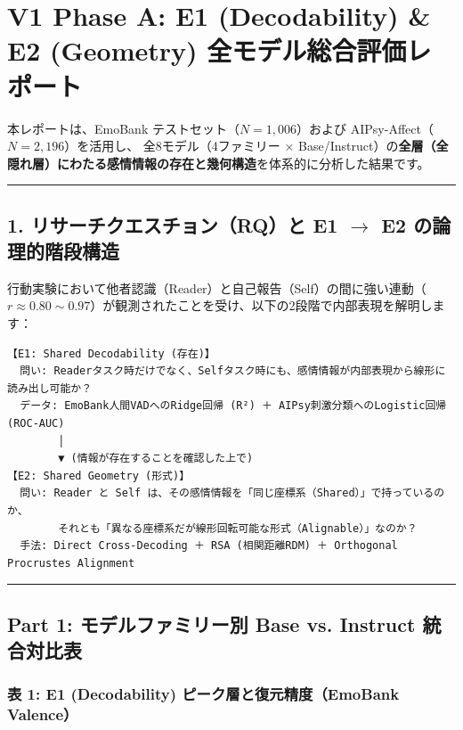 \section{V1 Phase A: E1 (Decodability) \& E2 (Geometry) 全モデル総合評価レポート}

本レポートは、EmoBank テストセット（$N=1,006$）および AIPsy-Affect（$N=2,196$）を活用し、
全8モデル（4ファミリー × Base/Instruct）の\textbf{全層（全隠れ層）にわたる感情情報の存在と幾何構造}を体系的に分析した結果です。

\vspace{0.5em}\hrule\vspace{0.5em}

\subsection{1. リサーチクエスチョン（RQ）と E1 $\rightarrow$ E2 の論理的階段構造}

行動実験において他者認識（Reader）と自己報告（Self）の間に強い連動（$r \approx 0.80 \sim 0.97$）が観測されたことを受け、以下の2段階で内部表現を解明します：

\begin{verbatim}
【E1: Shared Decodability (存在)】
  問い: Readerタスク時だけでなく、Selfタスク時にも、感情情報が内部表現から線形に読み出し可能か？
  データ: EmoBank人間VADへのRidge回帰 (R²) ＋ AIPsy刺激分類へのLogistic回帰 (ROC-AUC)
        │
        ▼ (情報が存在することを確認した上で)
【E2: Shared Geometry (形式)】
  問い: Reader と Self は、その感情情報を「同じ座標系（Shared）」で持っているのか、
        それとも「異なる座標系だが線形回転可能な形式（Alignable）」なのか？
  手法: Direct Cross-Decoding ＋ RSA (相関距離RDM) ＋ Orthogonal Procrustes Alignment
\end{verbatim}

\vspace{0.5em}\hrule\vspace{0.5em}

\subsection{Part 1: モデルファミリー別 Base vs. Instruct 統合対比表}

\subsubsection{表 1: E1 (Decodability) ピーク層と復元精度（EmoBank Valence）}

